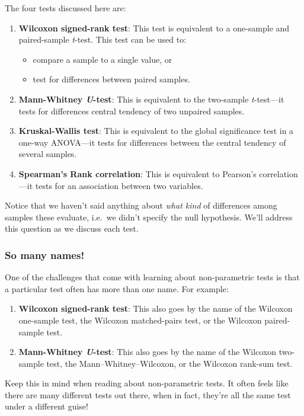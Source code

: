 \documentclass[
]{book}
\providecommand{\tightlist}{%
  \setlength{\itemsep}{0pt}\setlength{\parskip}{0pt}}
\newenvironment{greybox}{
  \definecolor{shadecolor}{rgb}{0.95,0.95,0.95}  %
  \color{black}
  \begin{shaded}}
 {\end{shaded}}
\newenvironment{infobox}[1]
  {
  \begin{itemize}
  \renewcommand{\labelitemi}{
    \raisebox{-.7\height}[0pt][0pt]{
      {\setkeys{Gin}{width=3em,keepaspectratio}
        \texttt{[image: images/\#1]}}
    }
  }
  \setlength{\fboxsep}{1em}
  \begin{greybox}
  \item
  }
  {
  \end{greybox}
  \end{itemize}
  }
\begin{document}
The four tests discussed here are:

\begin{enumerate}
\def\labelenumi{\arabic{enumi})}
\item
  \textbf{Wilcoxon signed-rank test}: This test is equivalent to a one-sample and paired-sample \emph{t}-test. This test can be used to:

  \begin{itemize}
  \tightlist
  \item
    compare a sample to a single value, or
  \item
    test for differences between paired samples.
  \end{itemize}
\item
  \textbf{Mann-Whitney \emph{U}-test}: This is equivalent to the two-sample \emph{t}-test---it tests for differences central tendency of two unpaired samples.
\item
  \textbf{Kruskal-Wallis test}: This is equivalent to the global significance test in a one-way ANOVA---it tests for differences between the central tendency of several samples.
\item
  \textbf{Spearman's Rank correlation}: This is equivalent to Pearson's correlation---it tests for an association between two variables.
\end{enumerate}

Notice that we haven't said anything about \emph{what kind} of differences among samples these evaluate, i.e.~we didn't specify the null hypothesis. We'll address this question as we discuss each test.

\begin{infobox}{warning}

\hypertarget{so-many-names}{%
\subsubsection*{So many names!}\label{so-many-names}}

One of the challenges that come with learning about non-parametric tests is that a particular test often has more than one name. For example:

\begin{enumerate}
\def\labelenumi{\arabic{enumi})}
\tightlist
\item
  \textbf{Wilcoxon signed-rank test}: This also goes by the name of the Wilcoxon one-sample test, the Wilcoxon matched-pairs test, or the Wilcoxon paired-sample test.
\item
  \textbf{Mann-Whitney \emph{U}-test}: This also goes by the name of the Wilcoxon two-sample test, the Mann--Whitney--Wilcoxon, or the Wilcoxon rank-sum test.
\end{enumerate}

Keep this in mind when reading about non-parametric tests. It often feels like there are many different tests out there, when in fact, they're all the same test under a different guise!

\end{infobox}
\end{document}
